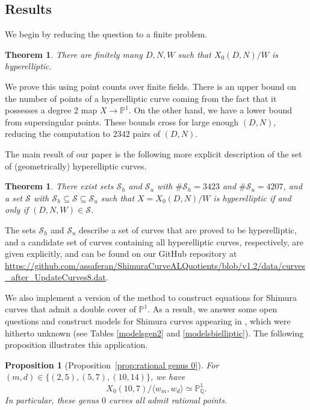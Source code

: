 \documentclass[12pt]{amsart}
\renewcommand{\P}{\mathbb{P}}
\newcommand{\Q}{\mathbb{Q}}
\newcommand{\calS}{\mathcal{S}}
\numberwithin{equation}{subsection}
\newtheorem{theorem}[equation]{Theorem}
\theoremstyle{plain}\newtheorem{ithm}{Theorem}
\theoremstyle{plain}\newtheorem{iprop}[ithm]{Proposition}
\newtheorem{proposition}[equation]{Proposition}
\theoremstyle{definition}
\theoremstyle{remark}
\newcommand{\Curve}[2]{X_0({#1},{#2})} %
\begin{document}
\subsection{Results}


We begin by reducing the question to a finite problem.

\begin{theorem}
\label{thm:finitenessmain}
    There are finitely many $D,N,W$ such that $\Curve{D}{N}/W$ is hyperelliptic. 
\end{theorem}
We prove this using point counts over finite fields. 
There is an upper bound on the number of points of a hyperelliptic curve coming from the fact that it possesses a degree 2 map $X \to \P^1$. On the other hand, we have a lower bound from supersingular points. These bounds cross for large enough $(D,N)$, reducing the computation to $2342$ pairs of $(D,N)$. 

The main result of our paper is the following more explicit description of the set of (geometrically) hyperelliptic curves.

\begin{theorem}
    There exist sets $\calS_h$ and $\calS_u$ with $\# \calS_h = 3423$ and $\# \calS_u = 4207$, and a set $\calS$ with $\calS_h \subseteq \calS \subseteq \calS_u$ such that
    $X = \Curve{D}{N}/W$ is hyperelliptic if and only if $(D,N,W) \in \calS$. 
\end{theorem}

The sets $\calS_h$ and $\calS_u$ describe a set of curves that are proved to be hyperelliptic, and a candidate set of curves containing all hyperelliptic curves, respectively, are given explicitly, and can be found on our GitHub repository \cite{GitHub} at \url{https://github.com/assaferan/ShimuraCurveALQuotients/blob/v1.2/data/curves_after_UpdateCurves8.dat}. 

We also implement a version of the method \cite{GY17} to construct equations for Shimura curves that admit a double cover of $\P^1$. 
As a result, we answer some open questions and construct models for Shimura curves appearing in \cite{OanaFreddy}, which were hitherto unknown (see Tables \ref{modelsgen2} and \ref{modelsbielliptic}). The following proposition illustrates this application.


\begin{proposition}[Proposition~\ref{prop:rational genus 0}]
For $(m,d) \in \{ (2,5), (5,7), (10,14) \}$, we have
\begin{equation}
    \Curve{10}{7}/\langle w_{m}, w_{d}\rangle \simeq \P^1_{\Q}.
\end{equation}
In particular, these genus $0$ curves all admit rational points.
\end{proposition}
\end{document}
